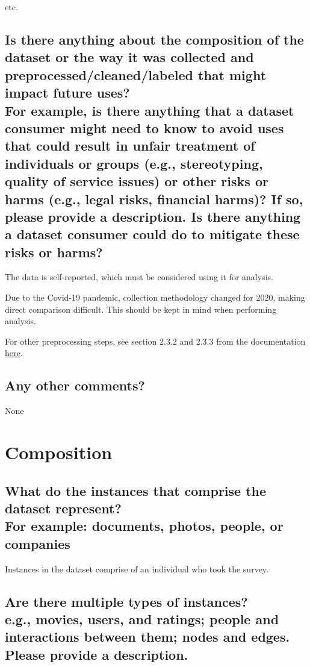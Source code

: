 \documentclass[letterpaper, 10 pt, conference]{ieeeconf}  %
\newcommand{\subtitle}[1]{{\\ \small \normalfont \color{purple} #1}}
\begin{document}
etc.

\subsection{Is there anything about the composition of the dataset or the way it was collected and preprocessed/cleaned/labeled that might impact future uses? \subtitle{For example, is there anything that a dataset consumer might need to know to avoid uses that could result in unfair treatment of individuals or groups (e.g., stereotyping, quality of service issues) or other risks or harms (e.g., legal risks, financial harms)? If so, please provide a description. Is there anything a dataset consumer could do to mitigate these risks or harms?}}

The data is self-reported, which must be considered using it for analysis.

Due to the Covid-19 pandemic, collection methodology changed for 2020, making direct comparison difficult. This should be kept in mind when performing analysis.

For other preprocessing steps, see section 2.3.2 and 2.3.3 from the documentation \href{https://www.samhsa.gov/data/sites/default/files/reports/rpt35330/2020NSDUHMethodSummDefs091721.pdf}{here}.

\subsection{Any other comments?}

None

\section{Composition}

\subsection{What do the instances that comprise the dataset represent? \subtitle{For example: documents, photos, people, or companies}}

Instances in the dataset comprise of an individual who took the survey.

\subsection{Are there multiple types of instances? \subtitle{e.g., movies, users, and ratings; people and interactions between them; nodes and edges. Please provide a description.}}
\end{document}

